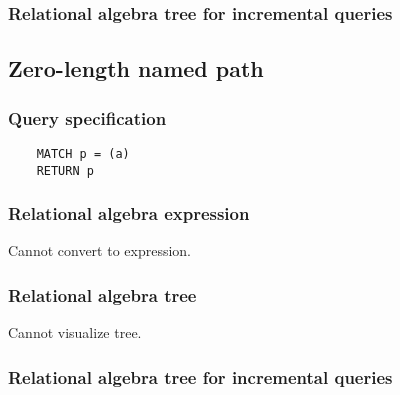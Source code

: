 
	\subsubsection*{Relational algebra tree for incremental queries}

	\subsection{Zero-length named path}

	\subsubsection*{Query specification}

	\begin{lstlisting}
	MATCH p = (a)
	RETURN p
	\end{lstlisting}


	\subsubsection*{Relational algebra expression}

	Cannot convert to expression.

	\subsubsection*{Relational algebra tree}

	Cannot visualize tree.

	\subsubsection*{Relational algebra tree for incremental queries}

